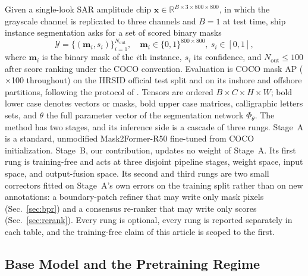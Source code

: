 Given a single-look SAR amplitude chip $\mathbf{x}\in\mathbb{R}^{B\times 3\times 800\times 800}$, in which the grayscale channel is replicated to three channels and $B=1$ at test time, ship instance segmentation asks for a set of scored binary masks
\begin{equation}\label{eq:output}
\mathcal{Y}=\bigl\{(\mathbf{m}_i,s_i)\bigr\}_{i=1}^{N_{\mathrm{out}}},\quad
\mathbf{m}_i\in\{0,1\}^{800\times 800},\ s_i\in[0,1],
\end{equation}
where $\mathbf{m}_i$ is the binary mask of the $i$th instance, $s_i$ its confidence, and $N_{\mathrm{out}}\le 100$ after score ranking under the COCO convention. Evaluation is COCO mask AP ($\times$100 throughout) on the HRSID official test split and on its inshore and offshore partitions, following the protocol of \cite{o2former2025}. Tensors are ordered $B\times C\times H\times W$; bold lower case denotes vectors or masks, bold upper case matrices, calligraphic letters sets, and $\theta$ the full parameter vector of the segmentation network $\Phi_{\theta}$. The method has two stages, and its inference side is a cascade of three rungs. Stage~A is a standard, unmodified Mask2Former-R50 \cite{mask2former2022} fine-tuned from COCO initialization. Stage~B, our contribution, updates no weight of Stage~A. Its first rung is training-free and acts at three disjoint pipeline stages, weight space, input space, and output-fusion space. Its second and third rungs are two small correctors fitted on Stage~A's own errors on the training split rather than on new annotations: a boundary-patch refiner that may write only mask pixels (Sec.~\ref{sec:bpr}) and a consensus re-ranker that may write only scores (Sec.~\ref{sec:rerank}). Every rung is optional, every rung is reported separately in each table, and the training-free claim of this article is scoped to the first.

\subsection{Base Model and the Pretraining Regime}\label{sec:base}

